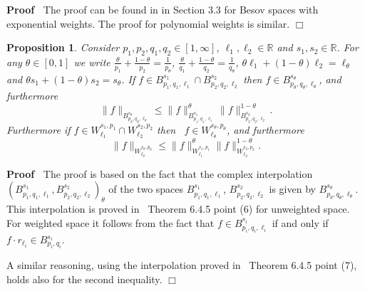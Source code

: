 \documentclass[a4paper,10pt]{article}
\newenvironment{proof}{\noindent\textbf{Proof\ }}{\hspace*{\fill}$\Box$\medskip}
\newtheorem{proposition}[theorem]{Proposition}
{\theorembodyfont{\rmfamily}\newtheorem{remark}[theorem]{Remark}}
\begin{document}
\begin{proof}
  The proof can be found in {\cite{MW17}} in Section 3.3 for Besov spaces with
  exponential weights. The proof for polynomial weights is similar.
\end{proof}

\begin{proposition}
  \label{proposition_interpolation}Consider $p_1, p_2, q_1, q_2 \in [1,
  \infty]$, $\ell_1, \ell_2 \in \mathbb{R}$ and $s_1, s_2 \in \mathbb{R}$. For
  any $\theta \in [0, 1]$ we write $\frac{\theta}{p_1} + \frac{1 -
  \theta}{p_2} = \frac{1}{p_{\theta}}$, $\frac{\theta}{q_1} + \frac{1 -
  \theta}{q_2} = \frac{1}{q_{\theta}}$, $\theta \ell_1 + (1 - \theta) \ell_2 =
  \ell_{\theta}$ and $\theta s_1 + (1 - \theta) s_2 = s_{\theta}$. If $f \in
  B^{s_1}_{p_1, q_1, \ell_1} \cap B^{s_2}_{p_2, q_2, \ell_2}$ then $f \in
  B^{s_{\theta}}_{p_{\theta}, q_{\theta}, \ell_{\theta}}$, and furthermore
  \[ \| f \|_{B^{s_{\theta}}_{p_{\theta}, q_{\theta}, \ell_{\theta}}} \leq \|
     f \|_{B^{s_1}_{p_1, q_1, \ell_1}}^{\theta} \| f \|_{B^{s_2}_{p_2, q_2,
     \ell_2}}^{1 - \theta} . \]
  Furthermore if $f \in W^{s_1, p_1}_{\ell_1} \cap W^{s_2, p_2}_{\ell_2}$ then
  \ $f \in W^{s_{\theta}, p_{\theta}}_{\ell_{\theta}}$, and furthermore
  \[ \| f \|_{W^{s_{\theta}, p_{\theta}}_{\ell_{\theta}}} \leq \| f
     \|_{W^{s_1, p_1}_{\ell_1}}^{\theta} \| f \|_{W^{s_2, p_2}_{\ell_2}}^{1 -
     \theta} . \]
\end{proposition}

\begin{proof}
  The proof is based on the fact that the complex interpolation
  $(B^{s_1}_{p_1, q_1, \ell_1}, B^{s_2}_{p_2, q_2, \ell_2})_{\theta}$ of the
  two spaces $B^{s_1}_{p_1, q_1, \ell_1}$, $B^{s_2}_{p_2, q_2, \ell_2}$ is
  given by $B^{s_{\theta}}_{p_{\theta}, q_{\theta}, \ell_{\theta}}$. This
  interpolation is proved in~{\cite{Joran1976}} Theorem 6.4.5 point (6) for
  unweighted space. For weighted space it follows from the fact that $f \in
  B^{s_i}_{p_i, q_i, \ell_i}$ if and only if $f \cdot r_{\ell_i} \in
  B^{s_i}_{p_i, q_i}$.
  
  A similar reasoning, using the interpolation proved in~{\cite{Joran1976}}
  Theorem 6.4.5 point (7), holds also for the second inequality.
\end{proof}





\end{document}
